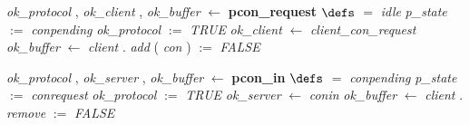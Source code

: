 \bresetindent
%
%
\vspace{-4.5ex}\bsetindent
\begin{tabbing}
\bSetTabs
\+\>
%
%
{\em ok\_protocol\/} , {\em ok\_client\/} , {\em ok\_buffer\/} $\longleftarrow$  {\bf { pcon\_request}}  \bhsp $\defs$ \+ \bnl
   $=$ {\em idle\/} \- \bhsp {} \+\bnl
{\em p\_state\/} $:=$  {\em conpending\/} \bparallel \bnl
{\em ok\_protocol\/} $:=$  {\em TRUE\/} \bparallel \bnl
{\em ok\_client\/} $\longleftarrow$ {\em client\_con\_request\/}\label{client_con_request}  \bparallel \bnl
{\em ok\_buffer\/} $\longleftarrow$ {\em client\/} . {\em add\/}\label{add}  ( {\em con\/} )  \-\bnl
{}  $:=$  {\em FALSE\/} \-\bnl
{}  \- \bOperationSemiColon 
\end{tabbing}
\bresetindent
%
%
\vspace{-4.5ex}\bsetindent
\begin{tabbing}
\bSetTabs
\+\>
%
%
{\em ok\_protocol\/} , {\em ok\_server\/} , {\em ok\_buffer\/} $\longleftarrow$  {\bf { pcon\_in}}  \bhsp $\defs$ \+ \bnl
   $=$ {\em conpending\/} \- \bhsp {} \+\bnl
{\em p\_state\/} $:=$  {\em conrequest\/} \bparallel \bnl
{\em ok\_protocol\/} $:=$  {\em TRUE\/} \bparallel \bnl
{\em ok\_server\/} $\longleftarrow$ {\em conin\/}\label{conin}  \bparallel \bnl
{\em ok\_buffer\/} $\longleftarrow$ {\em client\/} . {\em remove\/}\label{remove}  \-\bnl
{}  $:=$  {\em FALSE\/} \-\bnl
{}  \- \bOperationSemiColon 
\end{tabbing}
\bresetindent
%
%
\vspace{-4.5ex}\bsetindent
